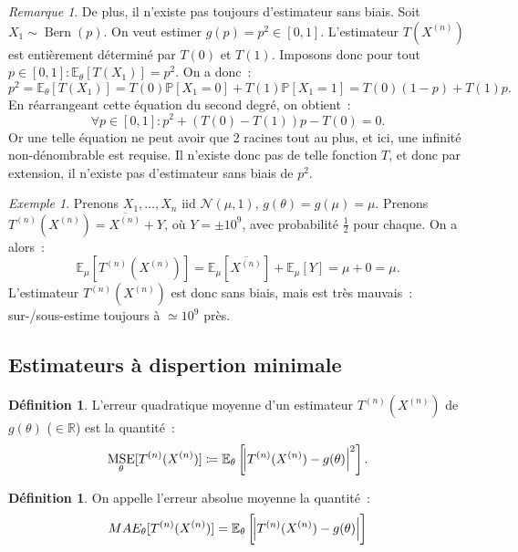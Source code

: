 \documentclass{report}
\DeclareMathOperator{\Bern}{Bern}  %
\DeclareMathOperator{\MSE}{MSE}
\renewcommand{\P}{\mathbb P}
\newcommand{\E}{\mathbb E}
\newcommand{\R}{\mathbb R}
\newcommand{\Xn}{{X^{(n)}}}
\newcommand{\Tn}{{T^{(n)}}}
\newcommand{\TnXn}{{\Tn(\Xn)}}
\theoremstyle{definition}
\newtheorem{déf}[thm]{Définition}
\theoremstyle{remark}
\newtheorem*{rmq}{Remarque}
\newtheorem{ex}{Exemple}[chapter]
\begin{document}
			\begin{rmq} De plus, il n'existe pas toujours d'estimateur sans biais. Soit $X_1 \sim \Bern(p)$. On veut estimer $g(p) = p^2 \in [0, 1]$. L'estimateur
			$T(X^{(n)})$ est entièrement déterminé par $T(0)$ et $T(1)$. Imposons donc pour tout $p \in [0, 1] : \E_\theta[T(X_1)] = p^2$. On a donc~:
			\[p^2 = \E_\theta[T(X_1)] = T(0)\P[X_1 = 0] + T(1)\P[X_1 = 1] = T(0)(1-p) + T(1)p.\]
			En réarrangeant cette équation du second degré, on obtient~:
			\[\forall p \in [0, 1] : p^2 + (T(0) - T(1))p - T(0) = 0.\]
			Or une telle équation ne peut avoir que 2 racines tout au plus, et ici, une infinité non-dénombrable est requise. Il n'existe donc pas de telle fonction $T$,
			et donc par extension, il n'existe pas d'estimateur sans biais de $p^2$.
			\end{rmq}

			\begin{ex} Prenons $X_1, \ldots, X_n$ iid $\mathcal N(\mu, 1)$, $g(\theta) = g(\mu) = \mu$. Prenons $\TnXn = \overline \Xn  + Y$, où $Y = \pm 10^9$, avec
			probabilité $\frac 12$ pour chaque. On a alors~:
			\[\E_\mu[\TnXn] = \E_\mu[\overline \Xn] + \E_\mu[Y] = \mu + 0 = \mu.\]
			L'estimateur $\TnXn$ est donc sans biais, mais est très mauvais~: sur-/sous-estime toujours à $\simeq 10^9$ près.
			\end{ex}

		\subsection{Estimateurs à dispertion minimale}
			\begin{déf} L'erreur quadratique moyenne d'un estimateur $\TnXn$ de $g(\theta)$ ($\in \R$) est la quantité~:
			\[\MSE_\theta[\TnXn] \coloneqq \E_\theta\left[\abs {\TnXn - g(\theta)}^2\right].\]
			\end{déf}

			\begin{déf} On appelle l'erreur absolue moyenne la quantité~:
			\[MAE_\theta[\TnXn] = \E_\theta\left[\abs {\TnXn - g(\theta)}\right]\]
			\end{déf}
\end{document}
